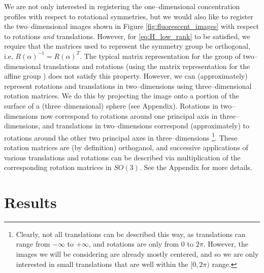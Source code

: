 \documentclass[11pt]{article}
\begin{document}
We are not only interested in registering the one--dimensional concentration profiles with respect to rotational symmetries, but we would also like to register the two--dimensional images shown in Figure \ref{fig:fluorescent_images} with respect to rotations {\em and} translations. 
%
However, for \eqref{eq:H_low_rank} to be satisfied, we require that the matrices used to represent the symmetry group be orthogonal, i.e. $R(\alpha)^{-1} = R(\alpha)^T$. 
%
The typical matrix representation for the group of two--dimensional translations and rotations (using the matrix representation for the affine group \cite{...}) does not satisfy this property. 
%
However, we can (approximately) represent rotations and translations in two--dimensions using three--dimensional rotation matrices.
%
We do this by projecting the image onto a portion of the surface of a (three--dimensional) sphere (see Appendix).
%
Rotations in two--dimensions now correspond to rotations around one principal axis in three--dimensions, and translations in two--dimensions correspond (approximately) to rotations around the other two principal axes in three--dimensions \footnote{Clearly, not all translations can be described this way, as translations can range from $-\infty$ to $+ \infty$, and rotations are only from $0$ to $2 \pi$. However, the images we will be considering are already mostly centered, and so we are only interested in small translations that are well within the $[0, 2\pi)$ range.}.
%
These rotation matrices are (by definition) orthoganol, and successive applications of various translations and rotations can be described via multiplication of the corresponding rotation matrices in $SO(3)$.
%
See the Appendix for more details.

\section{Results}
\end{document}
